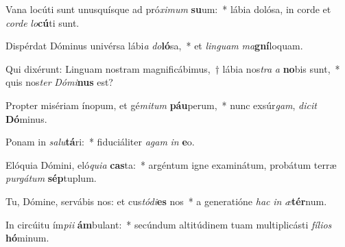 \item Vana locúti sunt unusquísque ad pró\textit{xi}\textit{mum} \textbf{su}um:~* lábia dolósa, in corde et \textit{cor}\textit{de} \textit{lo}\textbf{cú}ti sunt.
\item Dispérdat Dóminus univérsa lábi\textit{a} \textit{do}\textbf{ló}sa,~* et \textit{lin}\textit{guam} \textit{ma}\textbf{gní}loquam.
\item Qui dixérunt: Linguam nostram magnificábimus,~† lábia nos\textit{tra} \textit{a} \textbf{no}bis sunt,~* quis nos\textit{ter} \textit{Dó}\textit{mi}\textbf{nus} est?
\item Propter misériam ínopum, et gé\textit{mi}\textit{tum} \textbf{páu}perum,~* nunc exsúr\textit{gam}, \textit{di}\textit{cit} \textbf{Dó}minus.
\item Ponam in \textit{sa}\textit{lu}\textbf{tá}ri:~* fiduciáliter \textit{a}\textit{gam} \textit{in} \textbf{e}o.
\item Elóquia Dómini, eló\textit{qui}\textit{a} \textbf{cas}ta:~* argéntum igne examinátum, probátum terræ \textit{pur}\textit{gá}\textit{tum} \textbf{sép}tuplum.
\item Tu, Dómine, servábis nos: et cus\textit{tó}\textit{di}\textbf{es} nos~* a generatióne \textit{hac} \textit{in} \textit{æ}\textbf{tér}num.
\item In circúitu ím\textit{pi}\textit{i} \textbf{ám}bulant:~* secúndum altitúdinem tuam multiplicásti \textit{fí}\textit{li}\textit{os} \textbf{hó}minum.
